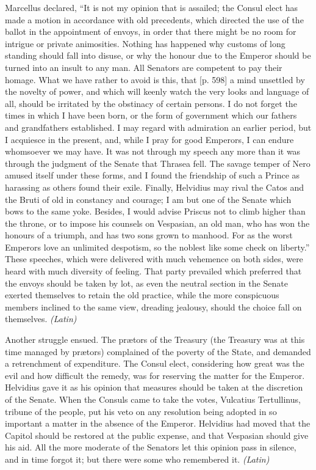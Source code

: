 
Marcellus declared, ``It is not my opinion that is assailed; the Consul elect has made a motion in accordance with old precedents, which directed the use of the ballot in the appointment of envoys, in order that there might be no room for intrigue or private animosities. Nothing has happened why customs of long standing should fall into disuse, or why the honour due to the Emperor should be turned into an insult to any man. All Senators are competent to pay their homage. What we have rather to avoid is this, that [p. 598] a mind unsettled by the novelty of power, and which will keenly watch the very looks and language of all, should be irritated by the obstinacy of certain persons. I do not forget the times in which I have been born, or the form of government which our fathers and grandfathers established. I may regard with admiration an earlier period, but I acquiesce in the present, and, while I pray for good Emperors, I can endure whomsoever we may have. It was not through my speech any more than it was through the judgment of the Senate that Thrasea fell. The savage temper of Nero amused itself under these forms, and I found the friendship of such a Prince as harassing as others found their exile. Finally, Helvidius may rival the Catos and the Bruti of old in constancy and courage; I am but one of the Senate which bows to the same yoke. Besides, I would advise Priscus not to climb higher than the throne, or to impose his counsels on Vespasian, an old man, who has won the honours of a triumph, and has two sons grown to manhood. For as the worst Emperors love an unlimited despotism, so the noblest like some check on liberty.'' These speeches, which were delivered with much vehemence on both sides, were heard with much diversity of feeling. That party prevailed which preferred that the envoys should be taken by lot, as even the neutral section in the Senate exerted themselves to retain the old practice, while the more conspicuous members inclined to the same view, dreading jealousy, should the choice fall on themselves. \emph{(Latin)}


Another struggle ensued. The prætors of the Treasury (the Treasury was at this time managed by prætors) complained of the poverty of the State, and demanded a retrenchment of expenditure. The Consul elect, considering how great was the evil and how difficult the remedy, was for reserving the matter for the Emperor. Helvidius gave it as his opinion that measures should be taken at the discretion of the Senate. When the Consuls came to take the votes, Vulcatius Tertullinus, tribune of the people, put his veto on any resolution being adopted in so important a matter in the absence of the Emperor. Helvidius had moved that the Capitol should be restored at the public expense, and that Vespasian should give his aid. All the more moderate of the Senators let this opinion pass in silence, and in time forgot it; but there were some who remembered it. \emph{(Latin)}

